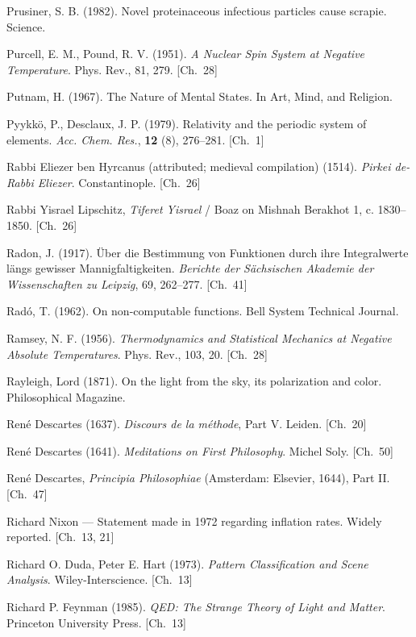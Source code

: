 \begin{list}{}{%
  \setlength{\leftmargin}{2em}%
  \setlength{\itemindent}{-2em}%
  \setlength{\itemsep}{0.35\baselineskip}%
  \setlength{\parsep}{0pt}%
  \setlength{\topsep}{0.5em}}
\item Prusiner, S. B. (1982). Novel proteinaceous infectious particles cause scrapie. Science.
\item Purcell, E. M., Pound, R. V. (1951). \textit{A Nuclear Spin System at Negative Temperature}. Phys. Rev., 81, 279. \hfill {\scriptsize [Ch.~28]}
\item Putnam, H. (1967). The Nature of Mental States. In Art, Mind, and Religion.
\item Pyykkö, P., Desclaux, J. P. (1979). Relativity and the periodic system of elements. \textit{Acc. Chem. Res.}, \textbf{12} (8), 276–281. \hfill {\scriptsize [Ch.~1]}
\item Rabbi Eliezer ben Hyrcanus (attributed; medieval compilation) (1514). \textit{Pirkei de-Rabbi Eliezer}. Constantinople. \hfill {\scriptsize [Ch.~26]}
\item Rabbi Yisrael Lipschitz, \textit{Tiferet Yisrael} / Boaz on Mishnah Berakhot 1, c. 1830–1850. \hfill {\scriptsize [Ch.~26]}
\item Radon, J. (1917). \"Uber die Bestimmung von Funktionen durch ihre Integralwerte l\"angs gewisser Mannigfaltigkeiten. \textit{Berichte der S\"achsischen Akademie der Wissenschaften zu Leipzig}, 69, 262–277. \hfill {\scriptsize [Ch.~41]}
\item Radó, T. (1962). On non-computable functions. Bell System Technical Journal.
\item Ramsey, N. F. (1956). \textit{Thermodynamics and Statistical Mechanics at Negative Absolute Temperatures}. Phys. Rev., 103, 20. \hfill {\scriptsize [Ch.~28]}
\item Rayleigh, Lord (1871). On the light from the sky, its polarization and color. Philosophical Magazine.
\item René Descartes (1637). \textit{Discours de la méthode}, Part V. Leiden. \hfill {\scriptsize [Ch.~20]}
\item René Descartes (1641). \textit{Meditations on First Philosophy}. Michel Soly. \hfill {\scriptsize [Ch.~50]}
\item René Descartes, \textit{Principia Philosophiae} (Amsterdam: Elsevier, 1644), Part II. \hfill {\scriptsize [Ch.~47]}
\item Richard Nixon — Statement made in 1972 regarding inflation rates. Widely reported. \hfill {\scriptsize [Ch.~13, 21]}
\item Richard O. Duda, Peter E. Hart (1973). \textit{Pattern Classification and Scene Analysis}. Wiley-Interscience. \hfill {\scriptsize [Ch.~13]}
\item Richard P. Feynman (1985). \textit{QED: The Strange Theory of Light and Matter}. Princeton University Press. \hfill {\scriptsize [Ch.~13]}

\end{list}
